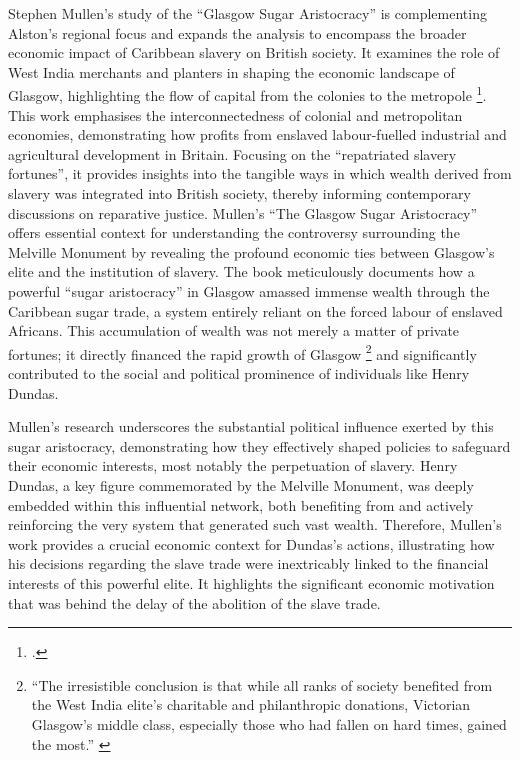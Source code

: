 \documentclass{scrartcl}
\renewcommand{\cite}{\parencite}
\begin{document}
Stephen Mullen's study of the ``Glasgow Sugar Aristocracy'' is complementing Alston's regional focus and expands the analysis to encompass the broader economic impact of Caribbean slavery on British society. It examines the role of West India merchants and planters in shaping the economic landscape of Glasgow, highlighting the flow of capital from the colonies to the metropole \footcite[``Perhaps so, but by including the
substantial estates of merchants with principal interests in Mauritius, and
others with no connection to Glasgow, Cooke’s estimations of the city’s
West India merchant capital were inflated by including East India fortunes
and returned sojourning wealth that improved other areas of Scotland.''][p.24]{mullen_2021}. This work emphasises the interconnectedness of colonial and metropolitan economies, demonstrating how profits from enslaved labour-fuelled industrial and agricultural development in Britain. Focusing on the ``repatriated slavery fortunes'', it provides insights into the tangible ways in which wealth derived from slavery was integrated into British society, thereby informing contemporary discussions on reparative justice.
Mullen's ``The Glasgow Sugar Aristocracy'' offers essential context for understanding the controversy surrounding the Melville Monument by revealing the profound economic ties between Glasgow's elite and the institution of slavery. The book meticulously documents how a powerful ``sugar aristocracy'' in Glasgow amassed immense wealth through the Caribbean sugar trade, a system entirely reliant on the forced labour of enslaved Africans. This accumulation of wealth was not merely a matter of private fortunes; it directly financed the rapid growth of Glasgow \footnote{``The irresistible
conclusion is that while all ranks of society benefited from the West India
elite’s charitable and philanthropic donations, Victorian Glasgow’s middle
class, especially those who had fallen on hard times, gained the most.'' \cite[][p.290]{mullen_2021}} and significantly contributed to the social and political prominence of individuals like Henry Dundas. 

Mullen's research underscores the substantial political influence exerted by this sugar aristocracy, demonstrating how they effectively shaped policies to safeguard their economic interests, most notably the perpetuation of slavery. Henry Dundas, a key figure commemorated by the Melville Monument, was deeply embedded within this influential network, both benefiting from and actively reinforcing the very system that generated such vast wealth. Therefore, Mullen's work provides a crucial economic context for Dundas's actions, illustrating how his decisions regarding the slave trade were inextricably linked to the financial interests of this powerful elite. It highlights the significant economic motivation that was behind the delay of the abolition of the slave trade.
\end{document}

